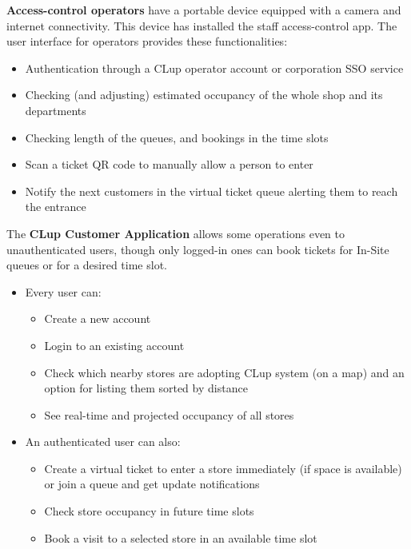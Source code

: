 \textbf{Access-control operators} have a portable device equipped with a camera and internet connectivity. This device has installed the staff access-control app. The user interface for operators provides these functionalities:
\begin{itemize}
    \item Authentication through a CLup operator account or corporation SSO service
    \item Checking (and adjusting) estimated occupancy of the whole shop and its departments
    \item Checking length of the queues, and bookings in the time slots
    \item Scan a ticket QR code to manually allow a person to enter
    \item Notify the next customers in the virtual ticket queue alerting them to reach the entrance
\end{itemize}

The \textbf{CLup Customer Application} allows some operations even to unauthenticated users, though only logged-in ones can book tickets for In-Site queues or for a desired time slot.
\begin{itemize}
    \item Every user can:
          \begin{itemize}
              \item Create a new account
              \item Login to an existing account
              \item Check which nearby stores are adopting CLup system (on a map) and an option for listing them sorted by distance
              \item See real-time and projected occupancy of all stores
          \end{itemize}
    \item An authenticated user can also:
          \begin{itemize}
              \item Create a virtual ticket to enter a store immediately (if space is available) or join a queue and get update notifications
              \item Check store occupancy in future time slots
              \item Book a visit to a selected store in an available time slot
          \end{itemize}
\end{itemize}

\vfill
\pagebreak

